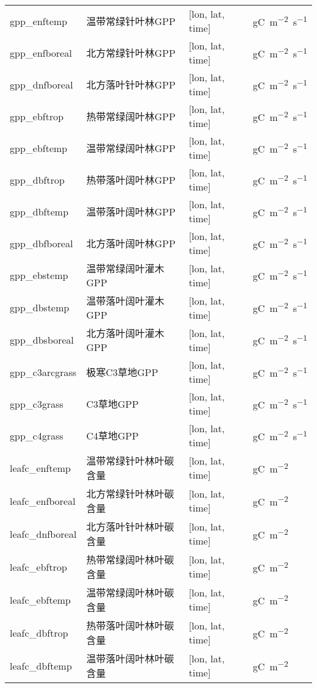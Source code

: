 {\begin{longtable}[htbp]{lp{}ll}
gpp\_enftemp & 温带常绿针叶林GPP & {[}lon, lat, time{]} & \unit{gC.m^{-2}.s^{-1}} \\
gpp\_enfboreal & 北方常绿针叶林GPP & {[}lon, lat, time{]} & \unit{gC.m^{-2}.s^{-1}} \\
gpp\_dnfboreal & 北方落叶针叶林GPP & {[}lon, lat, time{]} & \unit{gC.m^{-2}.s^{-1}} \\
gpp\_ebftrop & 热带常绿阔叶林GPP & {[}lon, lat, time{]} & \unit{gC.m^{-2}.s^{-1}} \\
gpp\_ebftemp & 温带常绿阔叶林GPP & {[}lon, lat, time{]} & \unit{gC.m^{-2}.s^{-1}} \\
gpp\_dbftrop & 热带落叶阔叶林GPP & {[}lon, lat, time{]} & \unit{gC.m^{-2}.s^{-1}} \\
gpp\_dbftemp & 温带落叶阔叶林GPP & {[}lon, lat, time{]} & \unit{gC.m^{-2}.s^{-1}} \\
gpp\_dbfboreal & 北方落叶阔叶林GPP & {[}lon, lat, time{]} & \unit{gC.m^{-2}.s^{-1}} \\
gpp\_ebstemp & 温带常绿阔叶灌木GPP & {[}lon, lat, time{]} & \unit{gC.m^{-2}.s^{-1}} \\
gpp\_dbstemp & 温带落叶阔叶灌木GPP & {[}lon, lat, time{]} & \unit{gC.m^{-2}.s^{-1}} \\
gpp\_dbsboreal & 北方落叶阔叶灌木GPP & {[}lon, lat, time{]} & \unit{gC.m^{-2}.s^{-1}} \\
gpp\_c3arcgrass & 极寒C3草地GPP & {[}lon, lat, time{]} & \unit{gC.m^{-2}.s^{-1}} \\
gpp\_c3grass & C3草地GPP & {[}lon, lat, time{]} & \unit{gC.m^{-2}.s^{-1}} \\
gpp\_c4grass & C4草地GPP & {[}lon, lat, time{]} & \unit{gC.m^{-2}.s^{-1}} \\
leafc\_enftemp & 温带常绿针叶林叶碳含量 & {[}lon, lat, time{]} & \unit{gC.m^{-2}} \\
leafc\_enfboreal & 北方常绿针叶林叶碳含量 & {[}lon, lat, time{]} & \unit{gC.m^{-2}} \\
leafc\_dnfboreal & 北方落叶针叶林叶碳含量 & {[}lon, lat, time{]} & \unit{gC.m^{-2}} \\
leafc\_ebftrop & 热带常绿阔叶林叶碳含量 & {[}lon, lat, time{]} & \unit{gC.m^{-2}} \\
leafc\_ebftemp & 温带常绿阔叶林叶碳含量 & {[}lon, lat, time{]} & \unit{gC.m^{-2}} \\
leafc\_dbftrop & 热带落叶阔叶林叶碳含量 & {[}lon, lat, time{]} & \unit{gC.m^{-2}} \\
leafc\_dbftemp & 温带落叶阔叶林叶碳含量 & {[}lon, lat, time{]} & \unit{gC.m^{-2}} \\

\end{longtable}}
